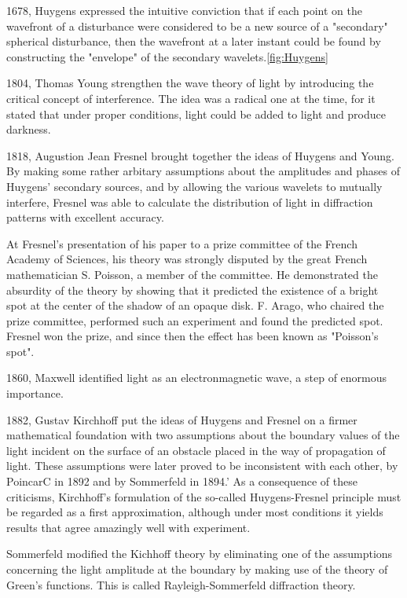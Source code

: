\documentclass[../main.tex]{subfiles}
\begin{document}
	1678, Huygens expressed the intuitive conviction that if each point on the wavefront of a disturbance were considered to be a new source of a "secondary" spherical disturbance, then the wavefront at a later instant could be found by constructing the "envelope" of the secondary wavelets.\ref{fig:Huygens}

	1804, Thomas Young strengthen the wave theory of light by introducing the critical concept of interference. The idea was a radical one at the time, for it stated that under proper conditions, light could be added to light and produce darkness.

	1818, Augustion Jean Fresnel brought together the ideas of Huygens and Young. By making some rather arbitary assumptions about the amplitudes and phases of Huygens' secondary sources, and by allowing the various wavelets to mutually interfere, Fresnel was able to calculate the distribution of light in diffraction patterns with excellent accuracy. 

	At Fresnel's presentation of his paper to a prize committee of the French Academy of Sciences, his theory was strongly disputed by the great French mathematician S. Poisson, a member of the committee. He demonstrated the absurdity of the theory by showing that it predicted the existence of a bright spot at the center of the shadow of an opaque disk. F. Arago, who chaired the prize committee, performed such an experiment and found the predicted spot. Fresnel won the prize, and since then the effect has been known as "Poisson's spot".

	1860, Maxwell identified light as an electronmagnetic wave, a step of enormous importance.

	1882, Gustav Kirchhoff put the ideas of Huygens and Fresnel on a firmer mathematical foundation with two assumptions about the boundary values of the light incident on the surface of an obstacle placed in the way of propagation of light. These assumptions were later proved to be inconsistent with each other, by PoincarC in 1892 and by Sommerfeld in 1894.' As a consequence of these criticisms, Kirchhoff's formulation of the so-called Huygens-Fresnel principle must be regarded as a first approximation, although under most conditions it yields results that agree amazingly well with experiment. 

	Sommerfeld modified the Kichhoff theory by eliminating one of the assumptions concerning the light amplitude at the boundary by making use of the theory of Green's functions. This is called Rayleigh-Sommerfeld diffraction theory.
\end{document}
